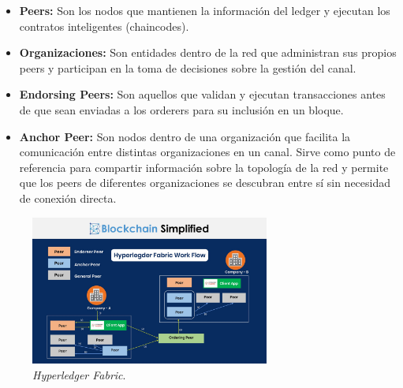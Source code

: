 \begin{itemize}
    \item \textbf{Peers:} Son los nodos que mantienen la información del ledger y ejecutan los contratos inteligentes (chaincodes).
    \item \textbf{Organizaciones:} Son entidades dentro de la red que administran sus propios peers y participan en la toma de decisiones sobre la gestión del canal.
    \item \textbf{Endorsing Peers:} Son aquellos que validan y ejecutan transacciones antes de que sean enviadas a los orderers para su inclusión en un bloque.
    \item \textbf{Anchor Peer:} Son nodos dentro de una organización que facilita la comunicación entre distintas organizaciones en un canal. Sirve como punto de referencia para compartir información sobre la topología de la red y permite que los peers de diferentes organizaciones se descubran entre sí sin necesidad de conexión directa.
\end{itemize}


\begin{figure}[!htbp]
    \centering
    \includegraphics[width=0.7\textwidth]{./Graphics/HLF.png}
    \caption{\textit{Hyperledger Fabric}.}
    \label{fig:HLF}
\end{figure}